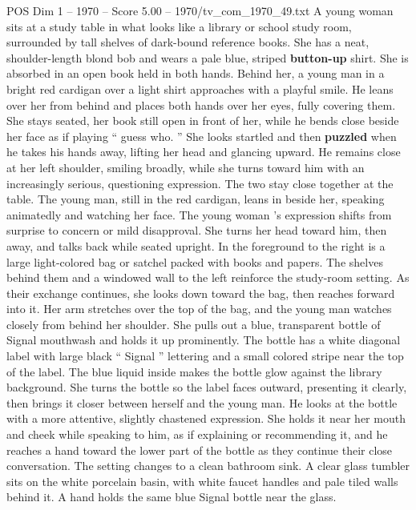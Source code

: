 \begin{textsample}{POS Dim 1 – 1970 – Score 5.00 – 1970/tv\_com\_1970\_49.txt}  \label{ex:f1_pos_068}
A young woman sits at a study table in what looks like a library or school study room, surrounded by tall shelves of dark-bound reference books.
She has a neat, shoulder-length blond bob and wears a pale blue, striped \textbf{button-up} shirt.
She is absorbed in an open book held in both hands.
Behind her, a young man in a bright red cardigan over a light shirt approaches with a playful smile.
He leans over her from behind and places both hands over her eyes, fully covering them.
She stays seated, her book still open in front of her, while he bends close beside her face as if playing “ guess who. ” She looks startled and then \textbf{puzzled} when he takes his hands away, lifting her head and glancing upward.
He remains close at her left shoulder, smiling broadly, while she turns toward him with an increasingly serious, questioning expression.
The two stay close together at the table.
The young man, still in the red cardigan, leans in beside her, speaking animatedly and watching her face.
The young woman ’s expression shifts from surprise to concern or mild disapproval.
She turns her head toward him, then away, and talks back while seated upright.
In the foreground to the right is a large light-colored bag or satchel packed with books and papers.
The shelves behind them and a windowed wall to the left reinforce the study-room setting.
As their exchange continues, she looks down toward the bag, then reaches forward into it.
Her arm stretches over the top of the bag, and the young man watches closely from behind her shoulder.
She pulls out a blue, transparent bottle of Signal mouthwash and holds it up prominently.
The bottle has a white diagonal label with large black “ Signal ” lettering and a small colored stripe near the top of the label.
The blue liquid inside makes the bottle glow against the library background.
She turns the bottle so the label faces outward, presenting it clearly, then brings it closer between herself and the young man.
He looks at the bottle with a more attentive, slightly chastened expression.
She holds it near her mouth and cheek while speaking to him, as if explaining or recommending it, and he reaches a hand toward the lower part of the bottle as they continue their close conversation.
The setting changes to a clean bathroom sink.
A clear glass tumbler sits on the white porcelain basin, with white faucet handles and pale tiled walls behind it.
A hand holds the same blue Signal bottle near the glass.

\end{textsample}
